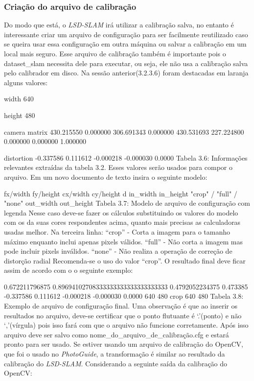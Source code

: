 \subsubsection{Criação do arquivo de calibração}

Do modo que está, o \textit{LSD-SLAM} irá utilizar a calibração salva, no entanto é interessante criar um arquivo de configuração para ser facilmente reutilizado caso se queira usar essa configuração em outra máquina ou salvar a calibração em um local mais seguro. Esse arquivo de calibração também é importante pois o dataset\_slam necessita dele para executar, ou seja, ele não usa a calibração salva pelo calibrador em disco. Na sessão anterior(3.2.3.6) foram destacadas em laranja alguns valores:

width
640

height
480

camera matrix
430.215550 0.000000 306.691343
0.000000 430.531693 227.224800
0.000000 0.000000 1.000000

distortion
-0.337586 0.111612 -0.000218 -0.000030 0.0000
Tabela 3.6: Informações relevantes extraídas da tabela 3.2.
Esses valores serão usados para compor o arquivo. Em um novo documento de texto insira o seguinte modelo:

fx/width fy/height cx/width cy/height d
in\_width in\_height
"crop" / "full" / "none"
out\_width out\_height
Tabela 3.7: Modelo de arquivo de configuração com legenda
Nesse caso deve-se fazer os cálculos substituindo os valores do modelo com os da suas cores respondentes acima, quanto mais precisas as calculadoras usadas melhor. Na terceira linha:
“crop” - Corta a imagem para o tamanho máximo enquanto inclui apenas pixels válidos.
“full” - Não corta a imagem mas pode incluir pixels inválidos.
“none” - Não realiza a operação de correção de distorção radial
Recomenda-se o uso do valor “crop”. O resultado final deve ficar assim de acordo com o o seguinte exemplo:

0.672211796875 0.89694102708333333333333333333333 0.4792052234375 0.473385 -0.337586 0.111612 -0.000218 -0.000030 0.0000 
640 480
crop
640 480
Tabela 3.8: Exemplo de arquivo de configuração final.
Uma observação é que ao inserir os resultados no arquivo, deve-se certificar que o ponto flutuante é ‘.’(ponto) e não ‘,’(vírgula) pois isso fará com que o arquivo não funcione corretamente. Após isso arquivo deve ser salvo como {nome\_do\_arquivo\_de\_calibração.cfg} e estará pronto para ser usado. Se estiver usando um arquivo de calibração do OpenCV, que foi o usado no \textit{PhotoGuide}, a transformação é similar ao resultado da calibração do \textit{LSD-SLAM}. Considerando a seguinte saída da calibração do OpenCV:

